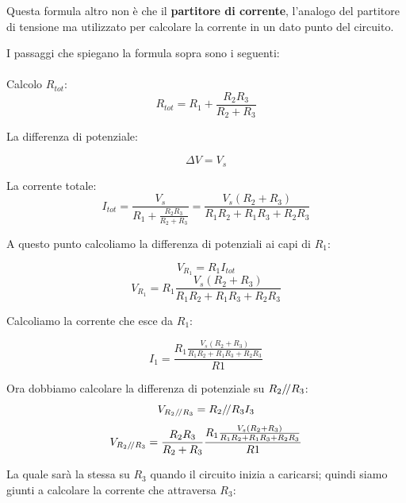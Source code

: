 Questa formula altro non è che il \textbf{partitore di corrente}, l'analogo del partitore di tensione ma utilizzato per calcolare la corrente in un dato punto del circuito.

I passaggi che spiegano la formula sopra sono i seguenti:

\paragraph{}
Calcolo $R_{tot}: $
\begin{equation*}
    R_{tot} = R_1 + \frac{R_2R_3}{R_2+R_3}
\end{equation*}

La differenza di potenziale:

\begin{equation*}
    \Delta V = V_s
\end{equation*}

La corrente totale:
\begin{equation*}
    I_{tot} = \frac{V_s}{R_1 + \frac{R_2R_3}{R_2 + R_3}} = \frac{V_s(R_2+R_3)}{R_1R_2 + R_1R_3+R_2R_3}
\end{equation*}

A questo punto calcoliamo la differenza di potenziali ai capi di $R_1$:

\begin{equation*}
    V_{R_1}  = R_1 I_{tot}
\end{equation*}
\begin{equation*}
    V_{R_1} = R_1 \frac{V_s(R_2+R_3)}{R_1R_2 + R_1R_3+R_2R_3}
\end{equation*}

Calcoliamo la corrente che esce da $R_1:$

\begin{equation*}
    I_1 = \frac{R_1 \frac{V_s(R_2+R_3)}{R_1R_2 + R_1R_3+R_2R_3}}{R1}
\end{equation*}

Ora dobbiamo calcolare la differenza di potenziale su $R_2/\!/ R_3$:
\begin{equation*}
    V_{R_2/\!/ R_3}  = R_2/\!/ R_3 I_3
\end{equation*}
\begin{equation*}
    V_{R_2/\!/ R_3}  = \frac{R_2R_3}{R_2+R_3} \frac{R_1 \frac{V_s(R_2+R_3)}{R_1R_2 + R_1R_3+R_2R_3}}{R1}
\end{equation*}


La quale sarà la stessa su $R_3$ quando il circuito inizia a caricarsi; quindi siamo giunti a calcolare la corrente che attraversa $R_3$:

